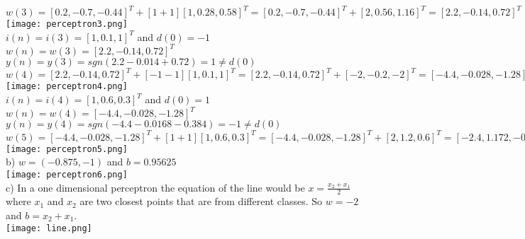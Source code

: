 \documentclass{article}
\begin{document}
\\ $ w(3) = [0.2,-0.7,-0.44]^{T} +[1+1][1, 0.28, 0.58]^{T}= [0.2,-0.7,-0.44]^{T} +[2, 0.56, 1.16]^{T}= [2.2,-0.14,0.72]^{T}$
\\  \texttt{[image: perceptron3.png]}
\\ $i(n) = i(3) = [1, 0.1, 1]^{T}$ and $ d(0) = -1$
\\ $w(n) = w(3)=[2.2,-0.14,0.72]^{T}$
\\ $y(n) = y(3) = sgn(2.2-0.014+0.72) = 1 \neq d(0)$
\\ $ w(4) = [2.2,-0.14,0.72]^{T} +[-1-1][1, 0.1, 1]^{T}= [2.2,-0.14,0.72]^{T} +[-2, -0.2, -2]^{T}= [-4.4,-0.028,-1.28]^{T}$
\\  \texttt{[image: perceptron4.png]}
\\ $i(n) = i(4) = [1, 0.6, 0.3]^{T}$ and $ d(0) = 1$
\\ $w(n) = w(4)=[-4.4,-0.028,-1.28]^{T}$
\\ $y(n) = y(4) = sgn(-4.4-0.0168-0.384) = -1 \neq d(0)$
\\ $ w(5) = [-4.4,-0.028,-1.28]^{T} +[1+1][1, 0.6, 0.3]^{T}= [-4.4,-0.028,-1.28]^{T} +[2, 1.2, 0.6]^{T}= [-2.4,1.172,-0.68]^{T}$
\\  \texttt{[image: perceptron5.png]}
\\
b) $w = (-0.875, -1)$ and $b = 0.95625$
\\ \texttt{[image: perceptron6.png]}
\\
c) In a one dimensional perceptron the equation of the line would be $ x= \frac{x_{2}+x_{1}}{2}$ where $x_{1}$ and $x_{2}$ are two closest points that are from different classes. So $w = -2$ and $b = x_{2}+x_{1}$. 
\\  \texttt{[image: line.png]}
\end{document}
